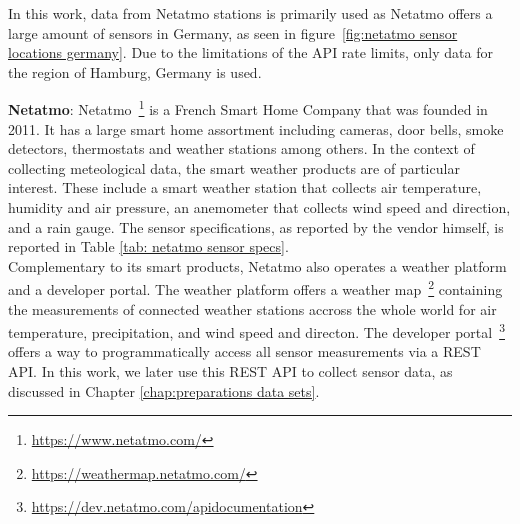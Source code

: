 In this work, data from Netatmo stations is primarily used as Netatmo offers a large amount of sensors in Germany, as seen in figure~\ref{fig:netatmo sensor locations germany}. Due to the limitations of the API rate limits, only data for the region of Hamburg, Germany is used.


\textbf{Netatmo}: Netatmo~\footnote{\url{https://www.netatmo.com/}} is a French Smart Home Company that was founded in 2011. It has a large smart home assortment including cameras, door bells, smoke detectors, thermostats and weather stations among others. In the context of collecting meteological data, the smart weather products are of particular interest. These include a smart weather station that collects air temperature, humidity and air pressure, an anemometer that collects wind speed and direction, and a rain gauge. The sensor specifications, as reported by the vendor himself, is reported in Table \ref{tab: netatmo sensor specs}.\\
Complementary to its smart products, Netatmo also operates a weather platform and a developer portal. The weather platform offers a weather map~\footnote{\url{https://weathermap.netatmo.com/}} containing the measurements of connected weather stations accross the whole world for air temperature, precipitation, and wind speed and directon. The developer portal~\footnote{\url{https://dev.netatmo.com/apidocumentation}} offers a way to programmatically access all sensor measurements via a REST API. In this work, we later use this REST API to collect sensor data, as discussed in Chapter \ref{chap:preparations data sets}.

